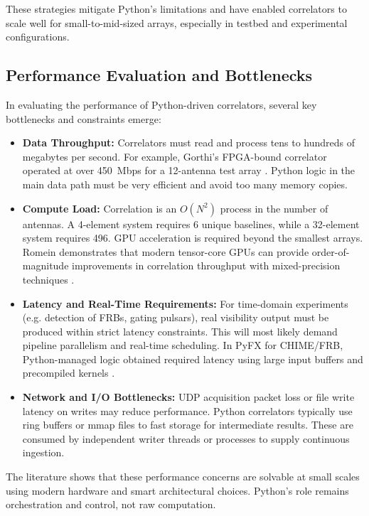     These strategies mitigate Python’s limitations and have enabled correlators to scale well for small-to-mid-sized arrays, especially in testbed and experimental configurations.

    \subsection{Performance Evaluation and Bottlenecks}
    In evaluating the performance of Python-driven correlators, several key bottlenecks and constraints emerge:

    \begin{itemize}
        \item \textbf{Data Throughput:} Correlators must read and process tens to hundreds of megabytes per second. For example, Gorthi's FPGA-bound correlator operated at over 450~Mbps for a 12-antenna test array \cite{Gorthi2021}. Python logic in the main data path must be very efficient and avoid too many memory copies.

        \item \textbf{Compute Load:} Correlation is an $O(N^2)$ process in the number of antennas. A 4-element system requires 6 unique baselines, while a 32-element system requires 496. GPU acceleration is required beyond the smallest arrays. Romein demonstrates that modern tensor-core GPUs can provide order-of-magnitude improvements in correlation throughput with mixed-precision techniques \cite{Romein2021}.
        
        \item \textbf{Latency and Real-Time Requirements:} For time-domain experiments (e.g. detection of FRBs, gating pulsars), real visibility output must be produced within strict latency constraints. This will most likely demand pipeline parallelism and real-time scheduling. In PyFX for CHIME/FRB, Python-managed logic obtained required latency using large input buffers and precompiled kernels \cite{Leung2024}.
        
        \item \textbf{Network and I/O Bottlenecks:} UDP acquisition packet loss or file write latency on writes may reduce performance. Python correlators typically use ring buffers or mmap files to fast storage for intermediate results. These are consumed by independent writer threads or processes to supply continuous ingestion.
    \end{itemize}

    The literature shows that these performance concerns are solvable at small scales using modern hardware and smart architectural choices. Python’s role remains orchestration and control, not raw computation.

